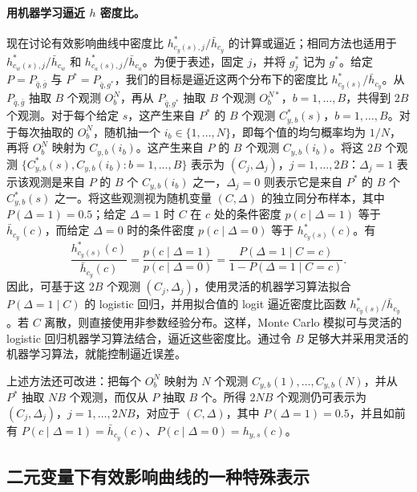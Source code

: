 \paragraph{用机器学习逼近 $h$ 密度比。}
现在讨论有效影响曲线中密度比 $h^*_{c_y(s),j}/\bar h_{c_y}$ 的计算或逼近；相同方法也适用于 $h^*_{c_w(s),j}/\bar h_{c_w}$ 和 $h^*_{c_a(s),j}/\bar h_{c_a}$。为便于表述，固定 $j$，并将 $g_j^*$ 记为 $g^*$。给定 $P=P_{\bar q,\bar g}$ 与 $P^*=P_{\bar q,g^*}$，我们的目标是逼近这两个分布下的密度比 $h^*_{c_y(s)}/\bar h_{c_y}$。从 $P_{\bar q,\bar g}$ 抽取 $B$ 个观测 $O_b^N$，再从 $P_{\bar q,g^*}$ 抽取 $B$ 个观测 $O_b^{N*}$，$b=1,\ldots,B$，共得到 $2B$ 个观测。对于每个给定 $s$，这产生来自 $P^*$ 的 $B$ 个观测 $C^*_{y,b}(s)$，$b=1,\ldots,B$。对于每次抽取的 $O_b^N$，随机抽一个 $i_b\in\{1,\ldots,N\}$，即每个值的均匀概率均为 $1/N$，再将 $O_b^N$ 映射为 $C_{y,b}(i_b)$。这产生来自 $P$ 的 $B$ 个观测 $C_{y,b}(i_b)$。将这 $2B$ 个观测 $\{C^*_{y,b}(s),C_{y,b}(i_b):b=1,\ldots,B\}$ 表示为 $(C_j,\Delta_j)$，$j=1,\ldots,2B$：$\Delta_j=1$ 表示该观测是来自 $P$ 的 $B$ 个 $C_{y,b}(i_b)$ 之一，$\Delta_j=0$ 则表示它是来自 $P^*$ 的 $B$ 个 $C^*_{y,b}(s)$ 之一。将这些观测视为随机变量 $(C,\Delta)$ 的独立同分布样本，其中 $P(\Delta=1)=0.5$；给定 $\Delta=1$ 时 $C$ 在 $c$ 处的条件密度 $p(c\mid\Delta=1)$ 等于 $\bar h_{c_y}(c)$，而给定 $\Delta=0$ 时的条件密度 $p(c\mid\Delta=0)$ 等于 $h^*_{c_y(s)}(c)$。有
\[
 \frac{h^*_{c_y(s)}(c)}{\bar h_{c_y}(c)}
 =\frac{p(c\mid\Delta=1)}{p(c\mid\Delta=0)}
 =\frac{P(\Delta=1\mid C=c)}{1-P(\Delta=1\mid C=c)}.
\]
因此，可基于这 $2B$ 个观测 $(C_j,\Delta_j)$，使用灵活的机器学习算法拟合 $P(\Delta=1\mid C)$ 的 logistic 回归，并用拟合值的 logit 逼近密度比函数 $h^*_{c_y(s)}/\bar h_{c_y}$。若 $C$ 离散，则直接使用非参数经验分布。这样，Monte Carlo 模拟可与灵活的 logistic 回归机器学习算法结合，逼近这些密度比。通过令 $B$ 足够大并采用灵活的机器学习算法，就能控制逼近误差。

上述方法还可改进：把每个 $O_b^N$ 映射为 $N$ 个观测 $C_{y,b}(1),\ldots,C_{y,b}(N)$，并从 $P^*$ 抽取 $NB$ 个观测，而仅从 $P$ 抽取 $B$ 个。所得 $2NB$ 个观测仍可表示为 $(C_j,\Delta_j)$，$j=1,\ldots,2NB$，对应于 $(C,\Delta)$，其中 $P(\Delta=1)=0.5$，并且如前有 $P(c\mid\Delta=1)=\bar h_{c_y}(c)$、$P(c\mid\Delta=0)=h_{y,s}(c)$。

\subsection{二元变量下有效影响曲线的一种特殊表示}

